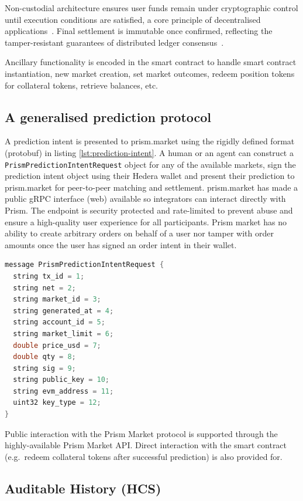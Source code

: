 \documentclass[11pt,a4paper]{article}
\begin{document}
Non-custodial architecture ensures user funds remain under cryptographic control until execution conditions are satisfied, a core principle of decentralised applications~\cite{poon2016}. Final settlement is immutable once confirmed, reflecting the tamper-resistant guarantees of distributed ledger consensus~\cite{szabo1997}.

Ancillary functionality is encoded in the smart contract to handle smart contract instantiation, new market creation, set market outcomes, redeem position tokens for collateral tokens, retrieve balances, etc.

\subsection{A generalised prediction protocol}

A prediction intent is presented to prism.market using the rigidly defined format (protobuf) in listing \ref{lst:prediction-intent}. A human or an agent can construct a \texttt{PrismPredictionIntentRequest} object for any of the available markets, sign the prediction intent object using their Hedera wallet and present their prediction to prism.market for peer-to-peer matching and settlement. prism.market has made a public gRPC interface (web) available so integrators can interact directly with Prism. The endpoint is security protected and rate-limited to prevent abuse and ensure a high-quality user experience for all participants. Prism market has no ability to create arbitrary orders on behalf of a user nor tamper with order amounts once the user has signed an order intent in their wallet.

\begin{lstlisting}[language=Java, caption={PrismPredictionIntentRequest protobuf definition}, label={lst:prediction-intent}, basicstyle=\ttfamily\small]
message PrismPredictionIntentRequest {
  string tx_id = 1;
  string net = 2;
  string market_id = 3;
  string generated_at = 4;
  string account_id = 5;
  string market_limit = 6;
  double price_usd = 7;
  double qty = 8;
  string sig = 9;
  string public_key = 10;
  string evm_address = 11;
  uint32 key_type = 12;
}
\end{lstlisting}

Public interaction with the Prism Market protocol is supported through the highly-available Prism Market API. Direct interaction with the smart contract (e.g.\ redeem collateral tokens after successful prediction) is also provided for.

\subsection{Auditable History (HCS)}
\end{document}
